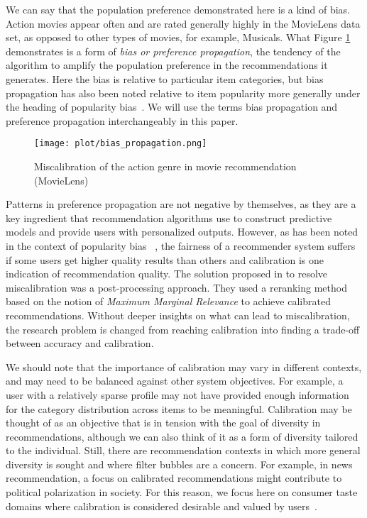 We can say that the population preference demonstrated here is a kind of bias. Action movies appear often and are rated generally highly in the MovieLens data set, as opposed to other types of movies, for example, Musicals. What Figure \ref{fig:ml_ar_a} demonstrates is a form of \textit{bias or preference propagation}, the tendency of the algorithm to amplify the population preference in the recommendations it generates. Here the bias is relative to particular item categories, but bias propagation has also been noted relative to item popularity more generally under the heading of popularity bias~\cite{jannach2015recommenders}. We will use the terms bias propagation and preference propagation interchangeably in this paper.

\begin{figure}[!b]
    \centering
    \texttt{[image: plot/bias\_propagation.png]}
    \caption{Miscalibration of the action genre in movie recommendation (MovieLens)}
    \label{fig:ml_ar_a}
\end{figure}

Patterns in preference propagation are not negative by themselves, as they are a key ingredient that recommendation algorithms use to construct predictive models and provide users with personalized outputs. However, as has been noted in the context of popularity bias ~\cite{abdollahpouri2019impact}, the fairness of a recommender system suffers if some users get higher quality results than others and calibration is one indication of recommendation quality. The solution proposed in \cite{steck2018calibrated} to resolve miscalibration was a post-processing approach. They used a reranking method based on the notion of \emph{Maximum Marginal Relevance} to achieve calibrated recommendations. Without deeper insights on what can lead to miscalibration, the research problem is changed from reaching calibration into finding a trade-off between accuracy and calibration. 

We should note that the importance of calibration may vary in different contexts, and may need to be balanced against other system objectives. For example, a user with a relatively sparse profile may not have provided enough information for the category distribution across items to be meaningful. Calibration may be thought of as an objective that is in tension with the goal of diversity in recommendations, although we can also think of it as a form of diversity tailored to the individual. Still, there are recommendation contexts in which more general diversity is sought and where filter bubbles \cite{pariser2011filter} are a concern. For example, in news recommendation, a focus on calibrated recommendations might contribute to political polarization in society. For this reason, we focus here on consumer taste domains where calibration is considered desirable and valued by users~\cite{steck2018calibrated}. 

